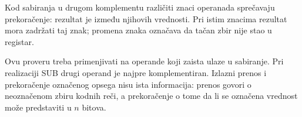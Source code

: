 Kod sabiranja u drugom komplementu različiti znaci operanada sprečavaju prekoračenje: rezultat je između njihovih vrednosti. Pri istim znacima rezultat mora zadržati taj znak; promena znaka označava da tačan zbir nije stao u registar.

Ovu proveru treba primenjivati na operande koji zaista ulaze u sabiranje. Pri realizaciji SUB drugi operand je najpre komplementiran. Izlazni prenos i prekoračenje označenog opsega nisu ista informacija: prenos govori o neoznačenom zbiru kodnih reči, a prekoračenje o tome da li se označena vrednost može predstaviti u $n$ bitova.
